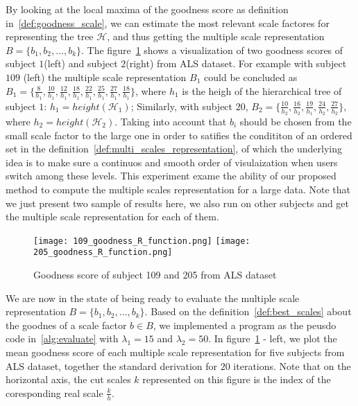 By looking at the local maxima of the goodness score as definition in~\ref{def:goodness_scale}, we can estimate the most relevant scale factores for representing the tree $\mathcal{H}$, and thus getting the multiple scale representation $\mathsf{\textit{B}} = \{b_1, b_2, \ldots, b_k\}$. The figure~\ref{fig:goodness_score} shows a visualization of two goodness scores of subject $1$(left) and subject $2$(right) from ALS dataset. 
For example with subject $109$ (left) the multiple scale representation $\mathsf{\textit{B}}_{1}$ could be concluded as $\mathsf{\textit{B}}_{1} = \{\frac{8}{h_1}, \frac{10}{h_1}, \frac{12}{h_1}, \frac{18}{h_1}, \frac{22}{h_1},\frac{25}{h_1},\frac{27}{h_1}, \frac{18}{h_1}\}$, where $h_1$ is the heigh of the hierarchical tree of subject $1$: $h_1= height(\mathcal{H}_{1})$; Similarly, with subject $20$, $\mathsf{\textit{B}}_{2} = \{\frac{10}{h_2}, \frac{16}{h_2}, \frac{19}{h_1}, \frac{24}{h_2},\frac{27}{h_2}\}$, where $h_2= height(\mathcal{H}_{2})$. Taking into account that $b_i$ should be chosen from the small scale factor to the large one in order to satifies the condititon of an ordered set in the definition~\ref{def:multi_scales_representation}, of which the underlying idea is to make sure a continuos and smooth order of visulaization when users switch among these levels. This experiment exame the ability of our proposed method to compute the multiple scales representation for a large data. Note that we just present two sample of results here, we also run on other subjects and get the multiple scale representation for each of them.
\begin{figure}
  \centering
  \texttt{[image: 109\_goodness\_R\_function.png]}
  \texttt{[image: 205\_goodness\_R\_function.png]}
  \caption{Goodness score of subject 109 and 205 from ALS dataset}%
  \label{fig:goodness_score}
\end{figure}
We are now in the state of being ready to evaluate the multiple scale representation $\mathsf{\textit{B}} = \{b_1, b_2, \ldots, b_k\}$. Based on the definition~\ref{def:best_scales} about the goodnes of a scale factor $b \in \mathsf{\textit{B}}$, we implemented a program as the peusdo code in~\ref{alg:evaluate} with $\lambda_1 = 15$ and $\lambda_2=50$. In figure~\ref{fig:goodness_score} - left, we plot the mean goodness score of each multiple scale representation for five subjects from ALS dataset, together the standard derivation for $20$ iterations. Note that on the horizontal axis, the cut scales $k$ represented on this figure is the index of the coresponding real scale $\frac{k}{h}$. 
